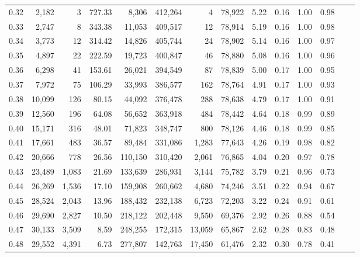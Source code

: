 \begin{tabular}{rrrrrrrrrrrrrr}
0.32 &   2,182 &      3 &   727.33 &    8,306 &  412,264 &       4 &  78,922 &  5.22 &  0.16 &  1.00 &      0.98 \\
0.33 &   2,747 &      8 &   343.38 &   11,053 &  409,517 &      12 &  78,914 &  5.19 &  0.16 &  1.00 &      0.98 \\
0.34 &   3,773 &     12 &   314.42 &   14,826 &  405,744 &      24 &  78,902 &  5.14 &  0.16 &  1.00 &      0.97 \\
0.35 &   4,897 &     22 &   222.59 &   19,723 &  400,847 &      46 &  78,880 &  5.08 &  0.16 &  1.00 &      0.96 \\
0.36 &   6,298 &     41 &   153.61 &   26,021 &  394,549 &      87 &  78,839 &  5.00 &  0.17 &  1.00 &      0.95 \\
0.37 &   7,972 &     75 &   106.29 &   33,993 &  386,577 &     162 &  78,764 &  4.91 &  0.17 &  1.00 &      0.93 \\
0.38 &  10,099 &    126 &    80.15 &   44,092 &  376,478 &     288 &  78,638 &  4.79 &  0.17 &  1.00 &      0.91 \\
0.39 &  12,560 &    196 &    64.08 &   56,652 &  363,918 &     484 &  78,442 &  4.64 &  0.18 &  0.99 &      0.89 \\
0.40 &  15,171 &    316 &    48.01 &   71,823 &  348,747 &     800 &  78,126 &  4.46 &  0.18 &  0.99 &      0.85 \\
0.41 &  17,661 &    483 &    36.57 &   89,484 &  331,086 &   1,283 &  77,643 &  4.26 &  0.19 &  0.98 &      0.82 \\
0.42 &  20,666 &    778 &    26.56 &  110,150 &  310,420 &   2,061 &  76,865 &  4.04 &  0.20 &  0.97 &      0.78 \\
0.43 &  23,489 &  1,083 &    21.69 &  133,639 &  286,931 &   3,144 &  75,782 &  3.79 &  0.21 &  0.96 &      0.73 \\
0.44 &  26,269 &  1,536 &    17.10 &  159,908 &  260,662 &   4,680 &  74,246 &  3.51 &  0.22 &  0.94 &      0.67 \\
0.45 &  28,524 &  2,043 &    13.96 &  188,432 &  232,138 &   6,723 &  72,203 &  3.22 &  0.24 &  0.91 &      0.61 \\
0.46 &  29,690 &  2,827 &    10.50 &  218,122 &  202,448 &   9,550 &  69,376 &  2.92 &  0.26 &  0.88 &      0.54 \\
0.47 &  30,133 &  3,509 &     8.59 &  248,255 &  172,315 &  13,059 &  65,867 &  2.62 &  0.28 &  0.83 &      0.48 \\
0.48 &  29,552 &  4,391 &     6.73 &  277,807 &  142,763 &  17,450 &  61,476 &  2.32 &  0.30 &  0.78 &      0.41 \\

\end{tabular}
